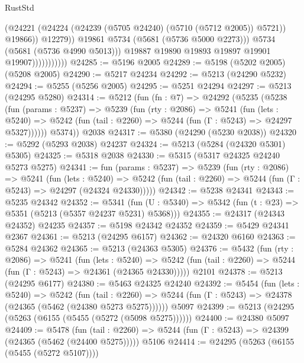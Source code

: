\begin{lexlean}{RustStd}
\begin{coremodule}
                                    (@24221
                                      (@24224 (@24239 (@5705 @24240) (@5710 (@5712 @2005)) @5721))
                                      @19866))
                                  @12279))
                              @19861
                              @5734
                              (@5681 (@5736 @5000 @2273)))
                            @5734
                            (@5681 (@5736 @4990 @5013)))
                          @19887
                          @19890
                          @19893
                          @19897
                          @19901
                          @19907)))))))))))
@24285 := @5196 @2005
@24289 := @5198 (@5202 @2005) (@5208 @2005)
@24290 := @5217 @24234
@24292 := @5213 (@24290 @5232)
@24294 := @5255 (@5256 @2005)
@24295 := @5251 @24294
@24297 := @5213 (@24295 @5280)
@24314 := @5212
    (fun (fn : @7) =>
    @24292
      (@5235
        (@5238
          (fun (params : @5237) =>
          @5239
            (fun (rty : @2086) =>
            @5241
              (fun (lets : @5240) =>
              @5242 (fun (tail : @2260) => @5244 (fun (Γ : @5243) => @24297 @5327))))))
        @5374))
    @2038
@24317 := @5380 (@24290 (@5230 @2038))
@24320 := @5292 (@5293 @2038) @24237
@24324 := @5213 (@5284 (@24320 @5301) @5305)
@24325 := @5318 @2038
@24330 := @5315 (@5317 @24325 @24240 @5273 @5275)
@24341 := fun (params : @5237) =>
  @5239
    (fun (rty : @2086) =>
    @5241
      (fun (lets : @5240) =>
      @5242 (fun (tail : @2260) => @5244 (fun (Γ : @5243) => @24297 (@24324 @24330)))))
@24342 := @5238 @24341
@24343 := @5235 @24342
@24352 := @5341
    (fun (U : @5340) => @5342 (fun (t : @23) => @5351 (@5213 (@5357 @24237 @5231) @5368)))
@24355 := @24317 (@24343 @24352) @24235
@24357 := @5198 @24342 @24352
@24359 := @5429 @24341 @2367
@24361 := @5213 (@24295 @6157)
@24362 := @24320 @6160
@24363 := @5284 @24362
@24365 := @5213 (@24363 @5305)
@24376 := @5432
    (fun (rty : @2086) =>
    @5241
      (fun (lets : @5240) =>
      @5242 (fun (tail : @2260) => @5244 (fun (Γ : @5243) => @24361 (@24365 @24330)))))
    @2101
@24378 := @5213 (@24295 @6177)
@24380 := @5463 @24325 @24240
@24392 := @5454
    (fun (lets : @5240) =>
    @5242
      (fun (tail : @2260) =>
      @5244 (fun (Γ : @5243) => @24378 (@24365 (@5462 (@24380 @5273 @5275))))))
    @5097
@24399 := @5213 (@24295 (@5263 (@6155 (@5455 (@5272 (@5098 @5275))))))
@24400 := @24380 @5097
@24409 := @5478
    (fun (tail : @2260) => @5244 (fun (Γ : @5243) => @24399 (@24365 (@5462 (@24400 @5275)))))
    @5106
@24414 := @24295 (@5263 (@6155 (@5455 (@5272 @5107))))

\end{coremodule}
\end{lexlean}
